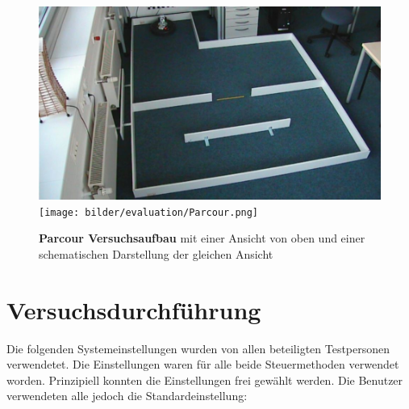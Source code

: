 \begin{figure}[ht]
\begin{center}
\includegraphics[scale=0.28]{bilder/evaluation/TopView.png}\hfill
\texttt{[image: bilder/evaluation/Parcour.png]}
\end{center}
\caption{\textbf{Parcour Versuchsaufbau} mit einer Ansicht von oben und einer schematischen Darstellung der gleichen Ansicht }
\label{fig:aufbau}
\end{figure}


\section{Versuchsdurchführung}
\label{section:versuchsdurchführung}
Die folgenden Systemeinstellungen wurden von allen beteiligten Testpersonen verwendetet. Die Einstellungen waren für alle beide Steuermethoden verwendet worden. Prinzipiell konnten die Einstellungen frei gewählt werden. Die Benutzer verwendeten alle jedoch die Standardeinstellung:

